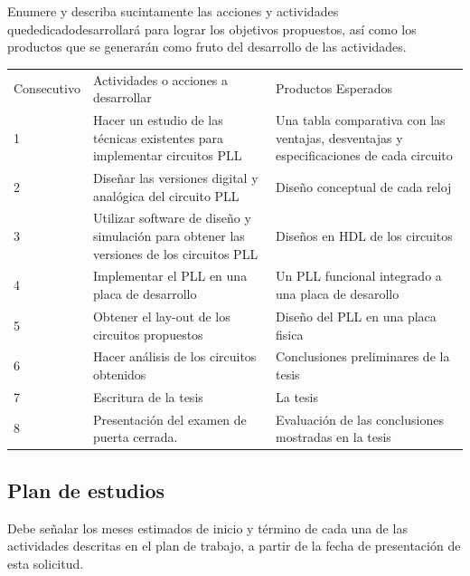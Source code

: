 \documentclass[runningheads,a4paper]{llncs}
\begin{document}
Enumere y describa sucintamente las acciones y actividades quededicadodesarrollará para lograr los objetivos propuestos, así como los productos que se generarán como fruto del desarrollo de las actividades. 
\begin{table}
\begin{center}
\begin{tabular}{|p{2cm}|p{5cm}|p{5cm}|} 
\hline\noalign{\smallskip}
Consecutivo & Actividades o acciones a desarrollar & Productos Esperados\\

\noalign{\smallskip}
\hline
\noalign{\smallskip}
1& Hacer un estudio de las técnicas existentes para implementar circuitos PLL & Una tabla comparativa con las ventajas, desventajas y especificaciones de cada circuito \\\hline
2&Diseñar las versiones digital y analógica del circuito PLL & Diseño conceptual de cada reloj \\\hline
3&Utilizar software de diseño y simulación para obtener las versiones de los circuitos PLL & Diseños en HDL de los circuitos\\\hline
4&Implementar el PLL en una placa de desarrollo & Un PLL funcional integrado a una placa de desarollo \\\hline
5&Obtener el lay-out de los circuitos propuestos & Diseño del PLL en una placa fisica \\\hline
6&Hacer análisis de los circuitos obtenidos & Conclusiones preliminares de la tesis\\\hline
7&Escritura de la tesis & La tesis \\\hline
8&Presentación del examen de puerta cerrada. & Evaluación de las conclusiones mostradas en la tesis \\\hline
\end{tabular}
\end{center}
\end{table}

\subsection{Plan de estudios }
Debe señalar los meses estimados de inicio y término de cada una de las actividades descritas en el plan de trabajo, a partir de la fecha de presentación de esta solicitud.
\end{document}
